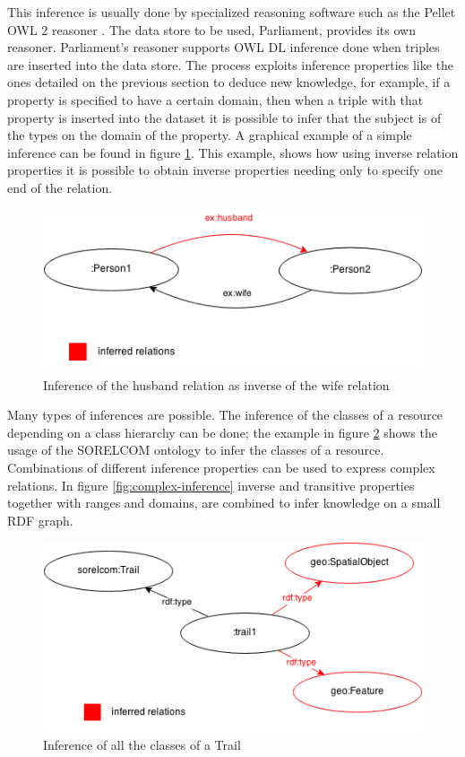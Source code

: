 This inference is usually done by specialized reasoning software such as the Pellet OWL 2 reasoner \cite{pelletweb}. The data store to be used, Parliament, provides its own reasoner. Parliament's reasoner supports OWL DL inference done when triples are inserted into the data store. The process exploits inference properties like the ones detailed on the previous section to deduce new knowledge, for example, if a property is specified to have a certain domain, then when a triple with that property is inserted into the dataset it is possible to infer that the subject is of the types on the domain of the property. A graphical example of a simple inference can be found in figure \ref{fig:simple-inference}. This example, shows how using inverse relation properties it is possible to obtain inverse properties needing only to specify one end of the relation.

\begin{figure}[ht]
  \centering
  \includegraphics[width=.6\textwidth]{fig/simple-inference}
  \caption{Inference of the husband relation as inverse of the wife relation}
  \label{fig:simple-inference}
\end{figure}

Many types of inferences are possible. The inference of the classes of a resource depending on a class hierarchy can be done; the example in figure \ref{fig:inference-hierarchy} shows the usage of the SORELCOM ontology to infer the classes of a resource. Combinations of different inference properties can be used to express complex relations. In figure \ref{fig:complex-inference} inverse and transitive properties together with ranges and domains, are combined to infer knowledge on a small RDF graph.

\begin{figure}[ht]
  \centering
  \includegraphics[width=.6\textwidth]{fig/inference-hierarchy}
  \caption{Inference of all the classes of a Trail}
  \label{fig:inference-hierarchy}
\end{figure}

